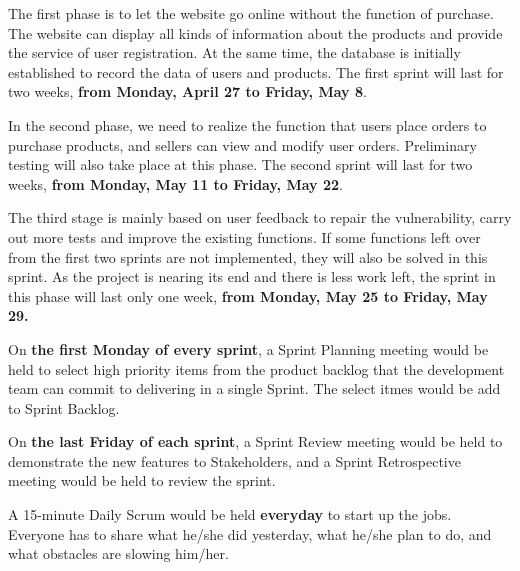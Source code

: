 \documentclass{report}
\begin{document}
The first phase is to let the website go online without the function of purchase. The website can display all kinds of information about the products and provide the service of user registration. At the same time, the database is initially established to record the data of users and products. The first sprint will last for two weeks, \textbf{from Monday, April 27 to Friday, May 8}. 

In the second phase, we need to realize the function that users place orders to purchase products, and sellers can view and modify user orders. Preliminary testing will also take place at this phase. The second sprint will last for two weeks, \textbf{from Monday, May 11 to Friday, May 22}.

The third stage is mainly based on user feedback to repair the vulnerability, carry out more tests and improve the existing functions. If some functions left over from the first two sprints are not implemented, they will also be solved in this sprint. As the project is nearing its end and there is less work left, the sprint in this phase will last only one week, \textbf{from Monday, May 25 to Friday, May 29.}

On \textbf{the first Monday of every sprint}, a Sprint Planning meeting would be held to select high priority items from the product backlog that the development team can commit to delivering in a single Sprint. The select itmes would be add to Sprint Backlog.

On \textbf{the last Friday of each sprint}, a Sprint Review meeting would be held to demonstrate the new features to Stakeholders, and a Sprint Retrospective meeting would be held to review the sprint.

A 15-minute Daily Scrum would be held \textbf{everyday} to start up the jobs. Everyone has to share what he/she did yesterday, what he/she plan to do, and what obstacles are slowing him/her.
\end{document}
